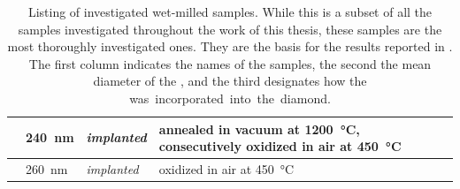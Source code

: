 \begin{table}[h!]
\begin{tabularx}{\linewidth}{@{} *3l X @{}}
				 \milltwotwofortyann & \SI{240}{nm} &  \textit{implanted}  &annealed in vacuum at \SI{1200}{\celsius}, consecutively oxidized in air at \SI{450}{\celsius}\\ \hline
				 \milltwotwosixtyno & \SI{260}{nm} &  \textit{implanted}  & oxidized in air at \SI{450}{\celsius}\\
				 \bottomrule
				 \end{tabularx}
				 \caption[Listing of investigated wet-milled samples]{Listing of investigated wet-milled samples. While this is a subset of all the samples investigated throughout the work of this thesis, these samples are the most thoroughly investigated ones. They are the basis for the results reported in . The first column indicates the names of the samples, the second the mean diameter of the \nds, and the third designates how the \si was incorporated into the diamond.} \label{tab::samplenames}
		\end{table}
